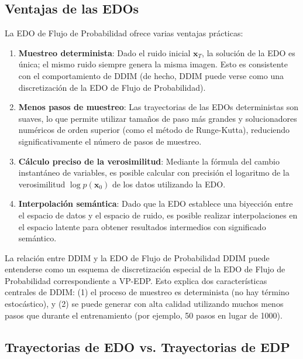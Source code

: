 \subsection{Ventajas de las EDOs}

La EDO de Flujo de Probabilidad ofrece varias ventajas prácticas:

\begin{enumerate}
    \item \textbf{Muestreo determinista}: Dado el ruido inicial $\mathbf{x}_T$, la solución de la EDO es única; el mismo ruido siempre genera la misma imagen. Esto es consistente con el comportamiento de DDIM (de hecho, DDIM puede verse como una discretización de la EDO de Flujo de Probabilidad).
    \item \textbf{Menos pasos de muestreo}: Las trayectorias de las EDOs deterministas son suaves, lo que permite utilizar tamaños de paso más grandes y solucionadores numéricos de orden superior (como el método de Runge-Kutta), reduciendo significativamente el número de pasos de muestreo.
    \item \textbf{Cálculo preciso de la verosimilitud}: Mediante la fórmula del cambio instantáneo de variables, es posible calcular con precisión el logaritmo de la verosimilitud $\log p(\mathbf{x}_0)$ de los datos utilizando la EDO.
    \item \textbf{Interpolación semántica}: Dado que la EDO establece una biyección entre el espacio de datos y el espacio de ruido, es posible realizar interpolaciones en el espacio latente para obtener resultados intermedios con significado semántico.
\end{enumerate}

\begin{knowledgebox}{La relación entre DDIM y la EDO de Flujo de Probabilidad}
DDIM puede entenderse como un esquema de discretización especial de la EDO de Flujo de Probabilidad correspondiente a VP-EDP. Esto explica dos características centrales de DDIM: (1) el proceso de muestreo es determinista (no hay término estocástico), y (2) se puede generar con alta calidad utilizando muchos menos pasos que durante el entrenamiento (por ejemplo, 50 pasos en lugar de 1000).
\end{knowledgebox}

\subsection{Trayectorias de EDO vs. Trayectorias de EDP}

